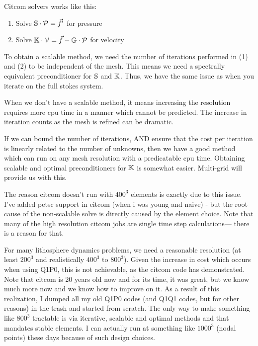 Citcom solvers works like this:
\begin{enumerate}
\item Solve ${\mathbb{S}} \cdot {\cal P} = \vec f'$  for pressure
\item Solve ${\mathbb{K}} \cdot {\cal V} = \vec f - {\mathbb{G}} \cdot {\cal P}$ for velocity
\end{enumerate}
To obtain a scalable method, we need the number of iterations performed in (1) and (2)
to be independent of the mesh. This means we need a spectrally equivalent preconditioner
for ${\mathbb{S}}$ and ${\mathbb{K}}$. Thus, we have the same issue as when you iterate on the full stokes system.

When we don't have a scalable method, it means increasing the resolution requires 
more cpu time in a manner which cannot be predicted. The increase in iteration counts 
as the mesh is refined can be dramatic.

If we can bound the number of iterations, AND ensure that the cost per iteration is 
linearly related to the number of unknowns, then we have a good method which can 
run on any mesh resolution with a predicatable cpu time. Obtaining scalable and 
optimal preconditioners for ${\mathbb{K}}$ is somewhat easier. Multi-grid will provide us with this.

The reason citcom doesn't run with $400^3$ elements is exactly due to this issue.
I've added petsc support in citcom (when i was young and naive) - but the root cause of the
non-scalable solve is directly caused by the element choice. Note that many of the high resolution
citcom jobs are single time step calculations--- there is a reason for that.

For many lithosphere dynamics problems, we need a reasonable resolution (at least $200^3$ and realistically $400^3$ to $800^3$). Given the increase in cost which occurs when using Q1P0, this is not achievable, as the citcom code has demonstrated.
Note that citcom is 20 years old now and for its time, it was great, 
but we know much more now and we know how to improve on it.
As a result of this realization, I dumped all my old Q1P0 codes (and Q1Q1 codes, but for other reasons) 
in the trash and started from scratch. The only way to make something like $800^3$ tractable is via iterative, scalable and optimal methods and
that mandates stable elements. I can actually run at something like $1000^3$ (nodal points) these days because of such design choices.


